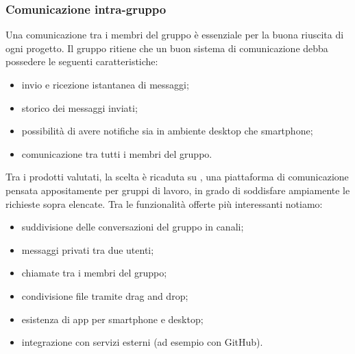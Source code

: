 \subsubsection{Comunicazione intra-gruppo} 
Una comunicazione tra i membri del gruppo è essenziale per la buona riuscita di ogni progetto. Il gruppo ritiene che un buon sistema di comunicazione debba possedere le seguenti caratteristiche:
\begin{itemize}
	\item invio e ricezione istantanea di messaggi;
	\item storico dei messaggi inviati;
	\item possibilità di avere notifiche  sia in ambiente desktop che smartphone;
	\item comunicazione tra tutti i membri del gruppo.
\end{itemize}
Tra i prodotti valutati, la scelta è ricaduta su , una piattaforma di comunicazione pensata appositamente per gruppi di lavoro, in grado di soddisfare ampiamente le richieste sopra elencate. Tra le funzionalità offerte più interessanti notiamo:
\begin{itemize}
	\item suddivisione delle conversazioni del gruppo in canali;
	\item messaggi privati tra due utenti;
	\item chiamate tra i membri del gruppo; 
	\item condivisione file tramite drag and drop;
	\item esistenza di app per smartphone e desktop;
	\item integrazione con servizi esterni (ad esempio con GitHub).
\end{itemize}
